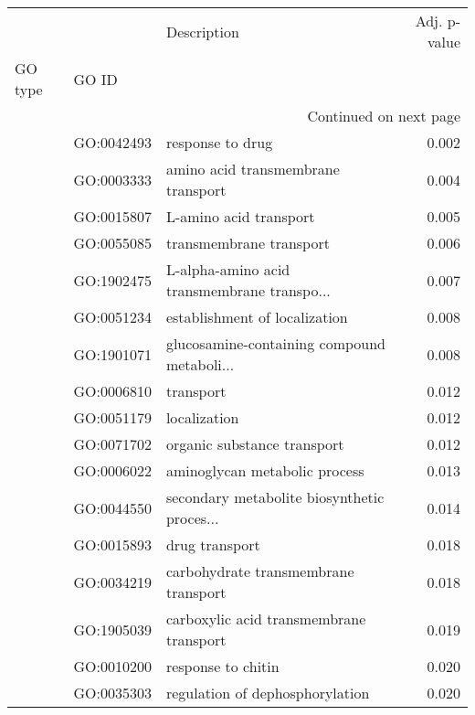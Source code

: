 \begin{longtable}{lllr}
\toprule
   &            &                                  Description &  Adj. p-value \\
GO type & GO ID &                                              &               \\
\midrule
\endhead
\midrule
\multicolumn{4}{r}{{Continued on next page}} \\
\midrule
\endfoot

\bottomrule
\endlastfoot
\multirow{47}{*}{BP} & GO:0042493 &                             response to drug &         0.002 \\
   & GO:0003333 &           amino acid transmembrane transport &         0.004 \\
   & GO:0015807 &                       L-amino acid transport &         0.005 \\
   & GO:0055085 &                      transmembrane transport &         0.006 \\
   & GO:1902475 &  L-alpha-amino acid transmembrane transpo... &         0.007 \\
   & GO:0051234 &                establishment of localization &         0.008 \\
   & GO:1901071 &  glucosamine-containing compound metaboli... &         0.008 \\
   & GO:0006810 &                                    transport &         0.012 \\
   & GO:0051179 &                                 localization &         0.012 \\
   & GO:0071702 &                  organic substance transport &         0.012 \\
   & GO:0006022 &                aminoglycan metabolic process &         0.013 \\
   & GO:0044550 &  secondary metabolite biosynthetic proces... &         0.014 \\
   & GO:0015893 &                               drug transport &         0.018 \\
   & GO:0034219 &         carbohydrate transmembrane transport &         0.018 \\
   & GO:1905039 &      carboxylic acid transmembrane transport &         0.019 \\
   & GO:0010200 &                           response to chitin &         0.020 \\
   & GO:0035303 &              regulation of dephosphorylation &         0.020 \\

\end{longtable}
